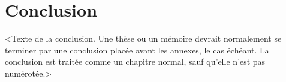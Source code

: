 \chapter*{Conclusion}           %
\label{chap-conclusion}         %

<Texte de la conclusion. Une thèse ou un mémoire devrait normalement
se terminer par une conclusion placée avant les annexes, le cas
échéant. La conclusion est traitée comme un chapitre normal, sauf
qu'elle n'est pas numérotée.>
